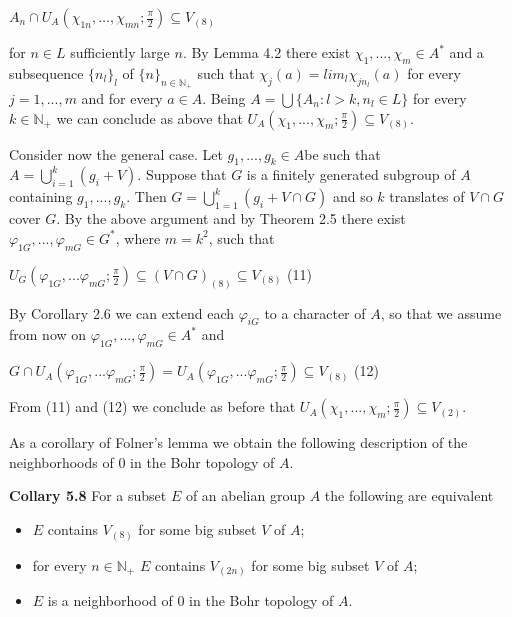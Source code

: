 \documentclass[12pt]{article}
\begin{document}
    $A_n \cap U_A (\chi_{1n}, \dots, \chi_{mn}; \frac{\pi}{2}) \subseteq V_{(8)}$


for $n \in L$ sufficiently large $n$. By Lemma 4.2 there exist $\chi_1, . . . , \chi_m \in A^*$ and a subsequence $\{n_l\}_l$ of $\{n\}_{n \in \mathbb{N}_+}$
such that $\chi_j (a) = lim_l \chi_{jn_l}(a)$ for every $j = 1, . . . , m$ and for every $a \in A$. Being $A =\bigcup \{A_n : l > k, n_l \in L\}$ for
every $k \in \mathbb{N}_+$ we can conclude as above that $U_A (\chi_1, . . . , \chi_m; \frac{\pi}{2}) \subseteq V_{(8)}$.


    Consider now the general case. Let $g_1, . . . , g_k \in A $be such that $A =\bigcup^k_{i=1}(g_i + V)$. Suppose that $G$ is a
finitely generated subgroup of $A$ containing $g_1, . . . , g_k$. Then $G = \bigcup^k_{1=1}(g_i + V \cap G)$ and so $k$ translates of $V \cap G$
cover $G$. By the above argument and by Theorem 2.5 there exist $\varphi_{1G}, . . . , \varphi_{mG} \in G^*$, where $m = k^2$, such that


    $U_G (\varphi_{1G}, ...  \varphi_{mG}; \frac{\pi}{2}) \subseteq (V \cap G)_{(8)} \subseteq V_{(8)}$ (11)



    By Corollary 2.6 we can extend each $\varphi_{iG}$ to a character of $A$, so that we assume from now on $\varphi_{1G}, . . . , \varphi_{mG} \in A^*$
and 


    $G \cap U_A (\varphi_{1G}, ...  \varphi_{mG}; \frac{\pi}{2}) = U_A (\varphi_{1G}, ...  \varphi_{mG}; \frac{\pi}{2}) \subseteq V_{(8)}$ (12)


From (11) and (12) we conclude as before that $U_A (\chi_1, ..., \chi_m; \frac{\pi}{2}) \subseteq V_{(2)}$.

    
    As a corollary of Folner's lemma we obtain the following description of the neighborhoods of 0 in the Bohr
topology of $A$.


\textbf{Collary 5.8} For a subset $E$ of an abelian group $A$ the following are equivalent

    \begin{itemize}

        \item $E$ contains $V_{(8)}$ for some big subset $V$ of $A$;

        \item for every $n \in \mathbb{N}_+$ $E$ contains $V_{(2n)}$ for some big subset $V$ of $A$;

        \item $E$ is a neighborhood of 0 in the Bohr topology of $A$.

    \end{itemize}
\end{document}
